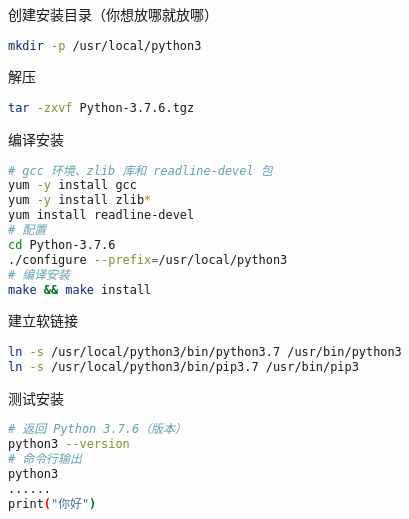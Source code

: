 创建安装目录（你想放哪就放哪）
\begin{lstlisting}[language=bash]
mkdir -p /usr/local/python3
\end{lstlisting}

解压
\begin{lstlisting}[language=bash]
tar -zxvf Python-3.7.6.tgz
\end{lstlisting}

编译安装
\begin{lstlisting}[language=bash]
# gcc 环境、zlib 库和 readline-devel 包
yum -y install gcc
yum -y install zlib*
yum install readline-devel
# 配置
cd Python-3.7.6
./configure --prefix=/usr/local/python3
# 编译安装
make && make install
\end{lstlisting}

建立软链接
\begin{lstlisting}[language=bash]
ln -s /usr/local/python3/bin/python3.7 /usr/bin/python3
ln -s /usr/local/python3/bin/pip3.7 /usr/bin/pip3
\end{lstlisting}

测试安装
\begin{lstlisting}[language=bash]
# 返回 Python 3.7.6（版本）
python3 --version
# 命令行输出
python3
......
print("你好")
\end{lstlisting}


